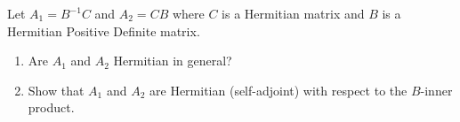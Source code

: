 \documentclass{ctexart}
\newif\ifpreface
\begin{document}
\large
\setlength{\baselineskip}{1.2em}
\ifpreface
    
\newgeometry{left=2cm,right=2cm,top=2cm,bottom=2cm}
\else
{}
\maketitle
\fi

\begin{problem} 
  Let \(A_1=B^{-1}C \) and \(A_2 =CB \) where \(C \) is a Hermitian matrix and 
  \(B \) is a Hermitian Positive Definite matrix. 
  \begin{enumerate}
    \item Are \(A_1 \) and \(A_2 \)   Hermitian in general? 
\item   Show that \(A_1 \) and \(A_2 \) are Hermitian (self-adjoint)
  with respect to the \(B \)-inner product.
  \end{enumerate}
\end{problem}
\end{document}
